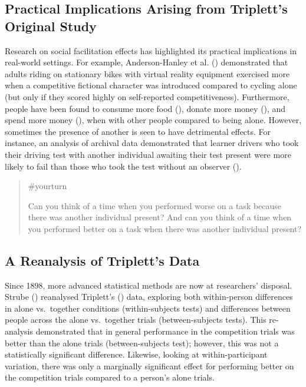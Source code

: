 \documentclass[
  letterpaper,
]{book}
\begin{document}
\subsection{Practical Implications Arising from Triplett's Original
Study}\label{practical-implications-arising-from-tripletts-original-study}

Research on social facilitation effects has highlighted its practical
implications in real-world settings. For example, Anderson-Hanley et al.
() demonstrated that
adults riding on stationary bikes with virtual reality equipment
exercised more when a competitive fictional character was introduced
compared to cycling alone (but only if they scored highly on
self-reported competitiveness). Furthermore, people have been found to
consume more food (), donate
more money (), and
spend more money (), when with other people compared to being alone. However,
sometimes the presence of another is seen to have detrimental effects.
For instance, an analysis of archival data demonstrated that learner
drivers who took their driving test with another individual awaiting
their test present were more likely to fail than those who took the test
without an observer ().

\begin{quote}
{\#yourturn}

Can you think of a time when you performed worse on a task because there
was another individual present? And can you think of a time when you
performed better on a task when there was another individual present?
\end{quote}

\subsection{A Reanalysis of Triplett's
Data}\label{a-reanalysis-of-tripletts-data}

Since 1898, more advanced statistical methods are now at researchers'
disposal. Strube () reanalysed
Triplett's () data, exploring both
within-person differences in alone vs.~together conditions
(within-subjects tests) and differences between people across the alone
vs.~together trials (between-subjects tests). This re-analysis
demonstrated that in general performance in the competition trials was
better than the alone trials (between-subjects test); however, this was
not a statistically significant difference. Likewise, looking at
within-participant variation, there was only a marginally significant
effect for performing better on the competition trials compared to a
person's alone trials.
\end{document}
